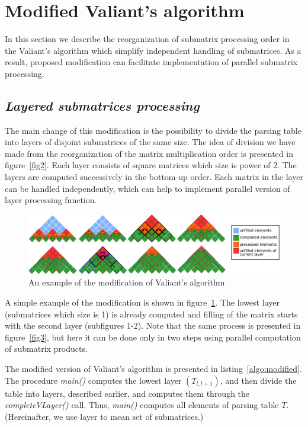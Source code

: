 \section{\bf Modified Valiant's algorithm}

In this section we describe the reorganization of submatrix processing order in the Valiant's algorithm which simplify independent handling of submatrices. As a result, proposed modification can facilitate implementation of parallel submatrix processing.

\subsection{\bf \it Layered submatrices processing}

The main change of this modification is the possibility to divide the parsing table into layers of disjoint submatrices of the same size.
The idea of division we have made from the reorganization of the matrix multiplication order is presented in figure~\ref{fig2}.
Each layer consists of square matrices which size is power of 2.
The layers are computed successively in the bottom-up order.
Each matrix in the layer can be handled independently, which can help to implement parallel version of layer processing function.

\begin{figure}[h]
\vspace{3mm}
 \begin{center}
 \includegraphics[width=12cm]{pictures/modivis2.pdf}
    \caption{An example of the modification of Valiant's algorithm}
    \label{fig4}
 \end{center}
\vspace{-8mm}
\end{figure}

A simple example of the modification is shown in figure~\ref{fig4}.
The lowest layer (submatrices which size is 1) is already computed and filling of the matrix starts with the second layer (subfigures 1-2).
Note that the same  process is presented in figure~\ref{fig3}, but here it can be done only in two steps using parallel computation of submatrix products.

The modified version of Valiant's algorithm is presented in listing~\ref{algo:modified}.
The procedure \textit{main()} computes the lowest layer $(T_{l, l+1})$, and then divide the table into layers, described earlier, and computes them through the \textit{completeVLayer()} call.
Thus, \textit{main()} computes all elements of parsing table $T$.
(Hereinafter, we use layer to mean set of submatrices.)

